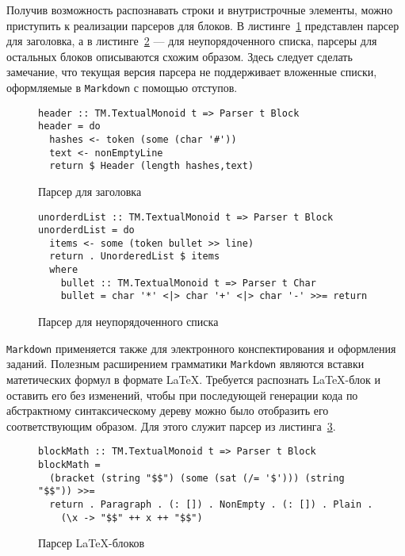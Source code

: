 Получив возможность распознавать строки и внутристрочные элементы, можно приступить к реализации парсеров для блоков. В листинге~\ref{listing:MarkdownHeader} представлен парсер для заголовка, а в листинге~\ref{listing:markdownUlist} --- для неупорядоченного списка, парсеры для остальных блоков описываются схожим образом. Здесь следует сделать замечание, что текущая версия парсера не поддерживает вложенные списки, оформляемые в \lstinline{Markdown} с помощью отступов.

\begin{figure}[t]
\begin{lstlisting}
header :: TM.TextualMonoid t => Parser t Block
header = do
  hashes <- token (some (char '#'))
  text <- nonEmptyLine
  return $ Header (length hashes,text)
\end{lstlisting}
\caption{Парсер для заголовка}
\label{listing:MarkdownHeader}
\end{figure}

\begin{figure}[t]
\begin{lstlisting}
unorderdList :: TM.TextualMonoid t => Parser t Block
unorderdList = do
  items <- some (token bullet >> line)
  return . UnorderedList $ items
  where
    bullet :: TM.TextualMonoid t => Parser t Char
    bullet = char '*' <|> char '+' <|> char '-' >>= return
\end{lstlisting}
\caption{Парсер для неупорядоченного списка}
\label{listing:markdownUlist}
\end{figure}

\lstinline{Markdown} применяется также для электронного конспектирования и
оформления заданий. Полезным расширением грамматики \lstinline{Markdown}
являются вставки матетических формул в формате \LaTeX. Требуется распознать
\LaTeX-блок и оставить его без изменений, чтобы при последующей генерации кода
по абстрактному синтаксическому дереву можно было отобразить его соответствующим
образом. Для этого служит парсер из листинга~\ref{listing:MarkdownLaTeX}.

\begin{figure}[h]
\begin{lstlisting}
blockMath :: TM.TextualMonoid t => Parser t Block
blockMath = 
  (bracket (string "$$") (some (sat (/= '$'))) (string "$$")) >>= 
  return . Paragraph . (: []) . NonEmpty . (: []) . Plain .
    (\x -> "$$" ++ x ++ "$$")
\end{lstlisting}
\caption{Парсер \LaTeX-блоков}
\label{listing:MarkdownLaTeX}
\end{figure}

